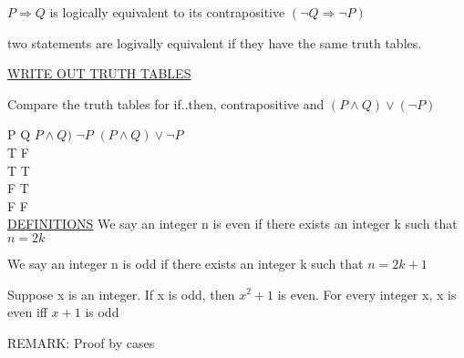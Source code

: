 \documentclass{report}
\begin{document}
\begin{itemize}
            $P \Longrightarrow Q$ is logically equivalent to its contrapositive $(\neg Q \Longrightarrow \neg P)$


        two statements are logivally equivalent if they have the same truth tables.

        \underline{WRITE OUT TRUTH TABLES}

        Compare the truth tables for if..then, contrapositive and $(P \wedge Q) \vee (\neg P)$

        P    Q   $P \wedge Q)$ $\neg P$      $(P \wedge Q) \vee \neg P$ \\
        T    F \\
        T    T \\
        F    T \\
        F    F \\

        \underline{DEFINITIONS}
        We say an integer n is even if there exists an integer k such that $n = 2k$

        We say an integer n is odd if there exists an integer k such that $n = 2k+1$

         {
          Suppose x is an integer.  If x is odd, then $x^2 + 1$ is even.
        }
         {
          For every integer x, x is even iff $x + 1$ is odd
        }

        REMARK: Proof by cases

  \end{itemize}
\end{document}
